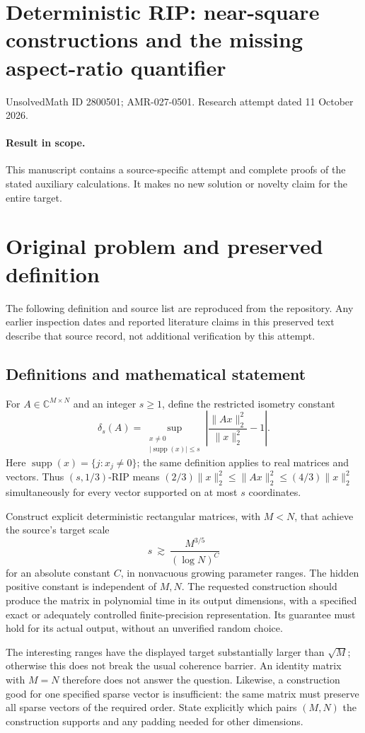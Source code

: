 \documentclass[11pt]{article}
\begin{document}
\section*{Deterministic RIP: near-square constructions and the missing aspect-ratio quantifier}
\noindent UnsolvedMath ID 2800501; AMR-027-0501. Research attempt dated 11 October 2026.
\paragraph{Result in scope.}This manuscript contains a source-specific attempt and complete proofs of the stated auxiliary calculations. It makes no new solution or novelty claim for the entire target.
\section{Original problem and preserved definition}
The following definition and source list are reproduced from the repository. Any earlier inspection dates and reported literature claims in this preserved text describe that source record, not additional verification by this attempt.
\subsection{Definitions and mathematical statement}
For $A\in\mathbb C^{M\times N}$ and an integer $s\ge1$, define the
restricted isometry constant
\[
 \delta_s(A)=\sup_{\substack{x\ne0\\|\operatorname{supp}(x)|\le s}}
             \left|\frac{\|Ax\|_2^2}{\|x\|_2^2}-1\right|.
\]
Here $\operatorname{supp}(x)=\{j:x_j\ne0\}$; the same definition applies
to real matrices and vectors. Thus $(s,1/3)$-RIP means
$(2/3)\|x\|_2^2\le\|Ax\|_2^2\le(4/3)\|x\|_2^2$ simultaneously
for every vector supported on at most $s$ coordinates.

Construct explicit deterministic rectangular matrices, with $M<N$,
that achieve the source's target scale
\[
                  s\ \gtrsim\ \frac{M^{3/5}}{(\log N)^C}
\]
for an absolute constant $C$, in nonvacuous growing parameter ranges.
The hidden positive constant is independent of $M,N$. The requested
construction should produce the matrix in polynomial time in its
output dimensions, with a specified exact or adequately controlled
finite-precision representation. Its guarantee must hold for its
actual output, without an unverified random choice.

The interesting ranges have the displayed target substantially larger
than $\sqrt M$; otherwise this does not break the usual coherence
barrier. An identity matrix with $M=N$ therefore does not answer the
question. Likewise, a construction good for one specified sparse
vector is insufficient: the same matrix must preserve all sparse
vectors of the required order. State explicitly which pairs $(M,N)$
the construction supports and any padding needed for other dimensions.
\end{document}
